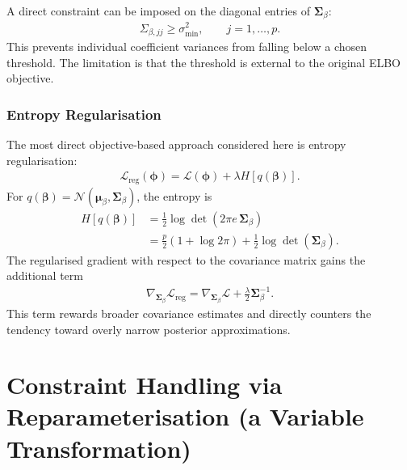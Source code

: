 \documentclass[11pt,a4paper]{article}
\newcommand{\N}{\mathcal{N}}
\begin{document}
A direct constraint can be imposed on the diagonal entries of $\bm{\Sigma}_\beta$:
\begin{align}
\Sigma_{\beta,jj} \geq \sigma^2_{\min}, \qquad j=1,\ldots,p.
\end{align}
This prevents individual coefficient variances from falling below a chosen threshold. The limitation is that the threshold is external to the original ELBO objective.

\subsubsection{Entropy Regularisation}

The most direct objective-based approach considered here is entropy regularisation:
\begin{align}
\mathcal{L}_{\mathrm{reg}}(\bm{\phi})
= \mathcal{L}(\bm{\phi}) + \lambda H[q(\bm{\beta})].
\end{align}
For $q(\bm{\beta})=\N(\bm{\mu}_\beta,\bm{\Sigma}_\beta)$, the entropy is
\begin{align}
H[q(\bm{\beta})]
&= \frac{1}{2}\log\det(2\pi e\,\bm{\Sigma}_\beta)\\
&= \frac{p}{2}(1+\log 2\pi) + \frac{1}{2}\log\det(\bm{\Sigma}_\beta).
\end{align}
The regularised gradient with respect to the covariance matrix gains the additional term
\begin{align}
\nabla_{\bm{\Sigma}_\beta}\mathcal{L}_{\mathrm{reg}}
= \nabla_{\bm{\Sigma}_\beta}\mathcal{L}
+ \frac{\lambda}{2}\bm{\Sigma}_\beta^{-1}.
\end{align}
This term rewards broader covariance estimates and directly counters the tendency toward overly narrow posterior approximations.
\section{Constraint Handling via Reparameterisation (a Variable Transformation)}
\end{document}

